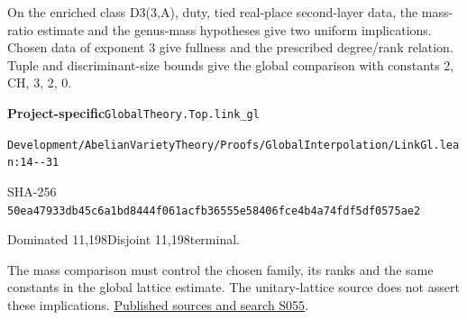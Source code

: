 
\begin{formalstatement}[D479]\label{decomp:D479}
On the enriched class D3(3,A), duty, tied real-place second-layer data, the mass-ratio estimate and the genus-mass hypotheses give two uniform implications. Chosen data of exponent 3 give fullness and the prescribed degree/rank relation. Tuple and discriminant-size bounds give the global comparison with constants 2, CH, 3, 2, 0.
\end{formalstatement}
{\small\raggedright\noindent\textsf{\bfseries Project-specific}\quad \nolinkurl{GlobalTheory.Top.link_gl}\par\noindent \nolinkurl{Development/AbelianVarietyTheory/Proofs/GlobalInterpolation/LinkGl.lean:14--31}\par\noindent SHA-256 \nolinkurl{50ea47933db45c6a1bd8444f061acfb36555e58406fce4b4a74fdf5df0575ae2}\par\noindent Dominated 11,198\quad Disjoint 11,198\quad terminal.\par}
The mass comparison must control the chosen family, its ranks and the same constants in the global lattice estimate. The unitary-lattice source does not assert these implications.
\hyperref[lit:S055]{Published sources and search S055}.
